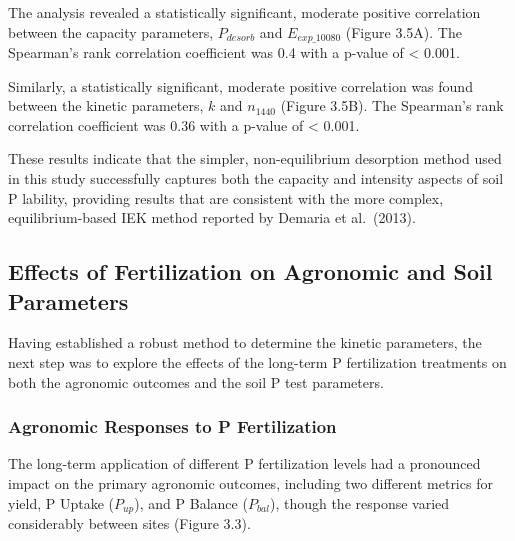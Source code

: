 \documentclass[
  a4paper,
]{article}
\begin{document}
The analysis revealed a statistically significant, moderate positive
correlation between the capacity parameters, \(P_{desorb}\) and
\(E_{exp\_10080}\) (Figure 3.5A). The Spearman's rank correlation
coefficient was 0.4 with a p-value of \textless{} 0.001.

Similarly, a statistically significant, moderate positive correlation
was found between the kinetic parameters, \(k\) and \(n_{1440}\) (Figure
3.5B). The Spearman's rank correlation coefficient was 0.36 with a
p-value of \textless{} 0.001.

These results indicate that the simpler, non-equilibrium desorption
method used in this study successfully captures both the capacity and
intensity aspects of soil P lability, providing results that are
consistent with the more complex, equilibrium-based IEK method reported
by Demaria et al.~(2013).

\subsection{Effects of Fertilization on Agronomic and Soil
Parameters}\label{effects-of-fertilization-on-agronomic-and-soil-parameters}

Having established a robust method to determine the kinetic parameters,
the next step was to explore the effects of the long-term P
fertilization treatments on both the agronomic outcomes and the soil P
test parameters.

\subsubsection{Agronomic Responses to P
Fertilization}\label{agronomic-responses-to-p-fertilization}

The long-term application of different P fertilization levels had a
pronounced impact on the primary agronomic outcomes, including two
different metrics for yield, P Uptake (\(P_{up}\)), and P Balance
(\(P_{bal}\)), though the response varied considerably between sites
(Figure 3.3).
\end{document}
